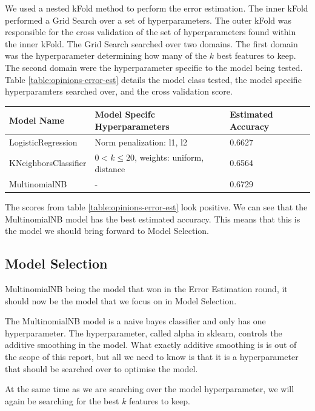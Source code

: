 \documentclass{report}
\begin{document}
We used a nested kFold method to perform the error estimation. The inner kFold performed a Grid Search over a set of hyperparameters.  The outer kFold was responsible for the cross validation of the set of hyperparameters found within the inner kFold. The Grid Search searched over two domains. The first domain was the hyperparameter determining how many of the $k$ best features to keep. The second domain were the hyperparameter specific to the model being tested. Table \ref{table:opinions-error-est} details the model class tested, the model specific hyperparamters searched over, and the cross validation score.

\begin{center}
  
  \begin{tabular}{l | l | l}
	  \textbf{Model Name} & \textbf{Model Specifc Hyperparameters} & \textbf{Estimated Accuracy} \\ \hline
	  LogisticRegression & Norm penalization: l1, l2 & 0.6627 \\ \hline
	  KNeighborsClassifier & $0 < k \leq 20$, weights: uniform, distance & 0.6564 \\ \hline
	  MultinomialNB & - & 0.6729
	  \label{table:opinions-error-est}
  \end{tabular}
\end{center}

The scores from table \ref{table:opinions-error-est} look positive. We can see that the MultinomialNB model has the best estimated accuracy. This means that this is the model we should bring forward to Model Selection.

\subsection{Model Selection}

MultinomialNB being the model that won in the Error Estimation round, it should now be the model that we focus on in Model Selection. 

The MultinomialNB model is a naive bayes classifier and only has one hyperparameter. The hyperparameter, called alpha in sklearn, controls the additive smoothing in the model. What exactly additive smoothing is is out of the scope of this report, but all we need to know is that it is a hyperparameter that should be searched over to optimise the model. 

At the same time as we are searching over the model hyperparameter, we will again be searching for the best $k$ features to keep.
\end{document}
